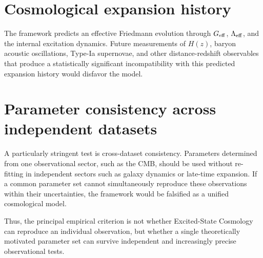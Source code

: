 \section{Cosmological expansion history}
The framework predicts an effective Friedmann evolution through $G_{\rm eff}$, $\Lambda_{\rm eff}$, and the internal excitation dynamics. Future measurements of $H(z)$, baryon acoustic oscillations, Type-Ia supernovae, and other distance-redshift observables that produce a statistically significant incompatibility with this predicted expansion history would disfavor the model.

\section{Parameter consistency across independent datasets}
A particularly stringent test is cross-dataset consistency. Parameters determined from one observational sector, such as the CMB, should be used without re-fitting in independent sectors such as galaxy dynamics or late-time expansion. If a common parameter set cannot simultaneously reproduce these observations within their uncertainties, the framework would be falsified as a unified cosmological model.

Thus, the principal empirical criterion is not whether Excited-State Cosmology can reproduce an individual observation, but whether a single theoretically motivated parameter set can survive independent and increasingly precise observational tests.
